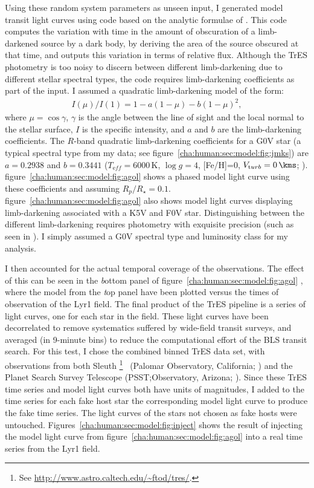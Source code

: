 Using these random system parameters as unseen input, I generated model transit light curves using code based on the analytic formulae of \citet{Mandel_Agol:apjl:2002a}.
This code computes the variation with time in the amount of obscuration of a limb-darkened source by a dark body, by deriving the area of the source obscured at that time, and outputs this variation in terms of relative flux.
Although the TrES photometry is too noisy to discern between different limb-darkening due to different stellar spectral types, the code requires limb-darkening coefficients as part of the input.
I assumed a quadratic limb-darkening model of the form:
\begin{eqnarray*}\label{cha:human:sec:model:eqn:limb}
I(\mu)/I(1) = 1-a(1-\mu)-b(1-\mu)^2,%
\end{eqnarray*}
where $\mu=\cos{\gamma}$, $\gamma$ is the angle between the line of sight and the local normal to the stellar surface, $I$ is the specific intensity, and $a$ and $b$ are the limb-darkening coefficients.
The $R$-band quadratic limb-darkening coefficients for a G0V star (a typical spectral type from my data; see figure~\ref{cha:human:sec:model:fig:jmks}) are $a=0.2938$ and $b=0.3441$ ($T_{\mathrm eff}=6000$\,K, $\log{g}=4$, [Fe/H]=0, $V_{\mathrm turb}=0\,\kms$; \citealt{Claret:aa:2000a}).
figure~\ref{cha:human:sec:model:fig:agol} %
shows a phased model light curve using these coefficients and assuming $R_{p}/R_{\star}=0.1$.
figure~\ref{cha:human:sec:model:fig:agol} %
also shows model light curves displaying limb-darkening associated with a K5V and F0V star.
Distinguishing between the different limb-darkening requires photometry with exquisite precision (such as seen in \citealt{Brown_Charbonneau_Gilliland:apj:2001a}).
I simply assumed a G0V spectral type and luminosity class for my analysis.

I then accounted for the actual temporal coverage of the observations.
The effect of this can be seen in the {\textit bottom panel} of figure~\ref{cha:human:sec:model:fig:agol}%
, where the model from the {\textit top panel} have been plotted versus the times of observation of the Lyr1 field.
The final product of the TrES pipeline is a series of light curves, one for each star in the field.
These light curves have been decorrelated to remove systematics suffered by wide-field transit surveys, and averaged (in 9-minute bins) to reduce the computational effort of the BLS transit search.
For this test, I chose the combined binned TrES data set, with observations from both Sleuth%
\footnote{See \url{http://www.astro.caltech.edu/\~ftod/tres/}.}%
\ (Palomar Observatory, California; \citealt{ODonovan_Charbonneau_Kotredes:AIP:2004a}) and the Planet Search Survey Telescope (PSST;\@Lowell Observatory, Arizona; \citealt{Dunham_Mandushev_Taylor:pasp:2004a}).
Since these TrES time series and model light curves both have units of magnitudes, I added to the time series for each fake host star the corresponding model light curve to produce the fake time series.
The light curves of the stars not chosen as fake hosts were untouched.
Figures~\ref{cha:human:sec:model:fig:inject} shows the result of injecting the model light curve from figure~\ref{cha:human:sec:model:fig:agol} %
into a real time series from the Lyr1 field.

